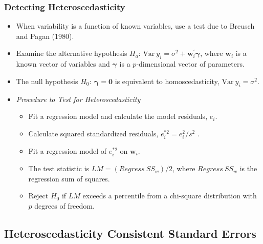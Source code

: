 \begin{frame}[shrink=2]
 \frametitle{Detecting Heteroscedasticity}
 \begin{itemize}
   \item When variability is a function of known variables, use a
   test due to Breusch and Pagan (1980).
 \item Examine the
alternative hypothesis $H_a$: $\mathrm{Var~} y_i = \sigma^2 +
\mathbf{w}_i^{\prime} \boldsymbol \gamma $, where $\mathbf{w}_i$ is
a known vector of variables and $\boldsymbol \gamma$ is a
$p$-dimensional vector of parameters.
 \item The null hypothesis $H_0:~ \boldsymbol \gamma = \mathbf{0}$
is equivalent to homoscedasticity,  $\mathrm{Var~} y_i = \sigma^2.$
 \item \textit{Procedure to Test for Heteroscedasticity}
\begin{itemize}
  \item Fit a regression model and calculate the model residuals, ${e_i}$.
  \item Calculate squared standardized residuals, $e_i^{\ast 2}=e_i^2/s^2$ .
  \item  Fit a
regression model of $e_i^{\ast 2}$ on $\mathbf{w}_i$.
\item The test statistic is $LM = (Regress~SS_w)/2$, where $Regress~SS_w$ is the regression sum of squares.
\item Reject $H_0$ if $LM$ exceeds a
percentile from a chi-square distribution with $p$ degrees of
freedom.
\end{itemize}
    \end{itemize}
\end{frame}

\subsection{Heteroscedasticity Consistent Standard
Errors}

